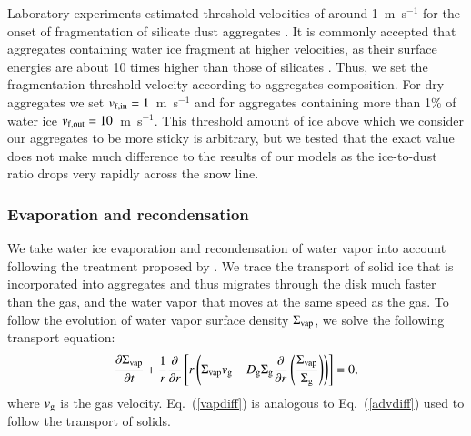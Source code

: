 \documentclass{aa}
\begin{document}
Laboratory experiments estimated threshold velocities of around 1~m~s$^{-1}$ for the onset of fragmentation of silicate dust aggregates \citep[see e.g.][]{2010A&A...513A..56G}. It is commonly accepted that aggregates containing water ice fragment at higher velocities, as their surface energies are about 10 times higher than those of silicates \citep{2011ApJ...737...36W, 2011Icar..214..717G, 2014MNRAS.437..690A, 2015ApJ...798...34G}. Thus, we set the fragmentation threshold velocity according to aggregates composition. For dry aggregates we set $v_{\rm{f,in}} = 1$~m~s$^{-1}$ and for aggregates containing more than 1\% of water ice $v_{\rm{f,out}} = 10$~m~s$^{-1}$. This threshold amount of ice above which we consider our aggregates to be more sticky is arbitrary, but we tested that the exact value does not make much difference to the results of our models as the ice-to-dust ratio drops very rapidly across the snow line.

\subsubsection{Evaporation and recondensation}\label{sub:evapcond}

We take water ice evaporation and recondensation of water vapor into account following the treatment proposed by \citet{2006Icar..181..178C}. We trace the transport of solid ice that is incorporated into aggregates and thus migrates through the disk much faster than the gas, and the water vapor that moves at the same speed as the gas. To follow the evolution of water vapor surface density $\Sigma_{\rm vap}$, we solve the following transport equation:
\begin{equation}\label{vapdiff}
\frac{\partial \Sigma_{\rm vap}}{\partial t} + \frac{1}{r} \frac{\partial}{\partial r}\left[r\left(\Sigma_{\rm vap}v_{\rm g}-D_{\rm g}\Sigma_{\rm g}\frac{\partial}{\partial r}\left(\frac{\Sigma_{\rm vap}}{\Sigma_{\rm g}}\right)\right)\right] = 0,
\end{equation}
where $v_{\rm g}$ is the gas velocity. Eq.~(\ref{vapdiff}) is analogous to Eq.~(\ref{advdiff}) used to follow the transport of solids.
\end{document}
